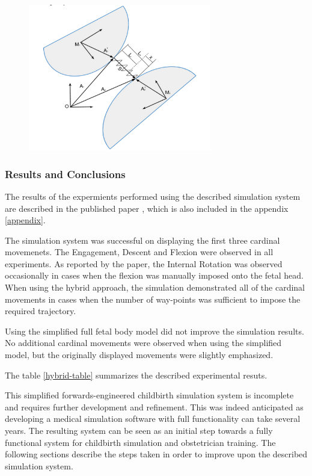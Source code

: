 \begin{figure}
  \centering
    \includegraphics[width=80mm]{sections/methodology/images/basic/mass-spring-detail.png}
  \caption[The detailed representation of a single spring attachment in the full body fetal mass-spring model. ]{\label{mass-spring-detail}}
\end{figure}

\subsubsection{Results and Conclusions}

The results of the expermients performed using the described simulation system are described in the published paper \cite{gerikhanov2013}, which is also included in the appendix \ref{appendix}.

The simulation system was successful on displaying the first three cardinal movemenets. The Engagement, Descent and Flexion were observed in all experiments. As reported by the paper, the Internal Rotation was observed occasionally in cases when the flexion was manually imposed onto the fetal head. When using the hybrid approach, the simulation demonstrated all of the cardinal movements in cases when the number of way-points was sufficient to impose the required trajectory.

Using the simplified full fetal body model did not improve the simulation results. No additional cardinal movements were observed when using the simplified model, but the originally displayed movements were slightly emphasized.

The table \ref{hybrid-table} summarizes the described experimental resuts.


This simplified forwards-engineered childbirth simulation system is incomplete and requires further development and refinement. This was indeed anticipated as  developing a medical simulation software with full functionality can take several years. The resulting system can be seen as an initial step towards a fully functional system for childbirth simulation and obstetrician training. The following sections describe the steps taken in order to improve upon the described simulation system.
